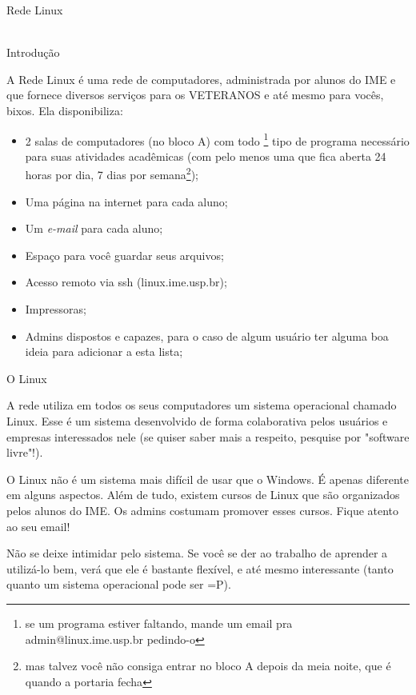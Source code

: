 \begin{secao}{Rede Linux}
\\
\\
\begin{subsecao}{Introdução}

A Rede Linux é uma rede de computadores, administrada por alunos do IME e
que fornece diversos serviços para os VETERANOS e até mesmo para vocês, bixos.
Ela disponibiliza:

\begin{itemize}
\item 2 salas de computadores (no bloco A) com todo \footnote{se um programa
estiver faltando, mande um email pra admin@linux.ime.usp.br pedindo-o} tipo de
programa necessário para suas atividades acadêmicas (com pelo menos uma que fica
aberta 24 horas por dia, 7 dias por semana\footnote{mas
talvez você não consiga entrar no bloco A depois da meia noite, que é quando a
portaria fecha});
\item Uma página na internet para cada aluno;
\item Um \textit{e-mail} para cada aluno;
\item Espaço para você guardar seus arquivos;
\item Acesso remoto via ssh (linux.ime.usp.br);
\item Impressoras;
\item Admins dispostos e capazes, para o caso de algum usuário ter alguma boa
ideia para adicionar a esta lista;
\end{itemize}
\end{subsecao}

\begin{subsecao}{O Linux}

A rede utiliza em todos os seus computadores um sistema operacional chamado
Linux. Esse é um sistema desenvolvido de forma colaborativa pelos usuários
e empresas interessados nele (se quiser saber mais a respeito, pesquise
por "software livre"!).

O Linux não é um sistema mais difícil de usar que o Windows. É apenas
diferente em alguns aspectos. Além de tudo, existem cursos de Linux que são
organizados pelos alunos do IME. Os admins costumam promover esses cursos.
Fique atento ao seu email!

Não se deixe intimidar pelo sistema. Se você se der ao trabalho de
aprender a utilizá-lo bem, verá que ele é bastante flexível, e até mesmo
interessante (tanto quanto um sistema operacional pode ser =P).

\end{subsecao}


\end{secao}
